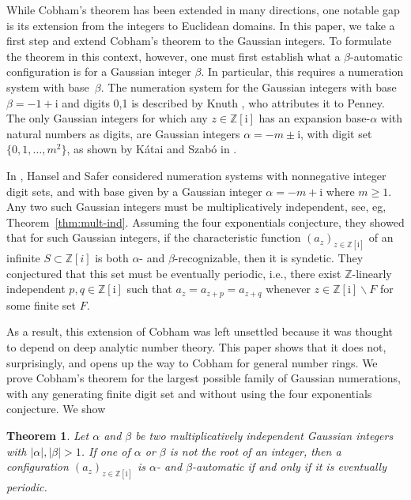 \documentclass{amsart}
\newcommand{\Z}{\mathbb{Z}}
\newcommand{\ii}{\mathrm{i}}
\newtheorem{theorem}{Theorem}
\newtheorem*{main theorem}{Theorem \ref{thm:main-gaussian}}
\theoremstyle{definition}
\begin{document}
While Cobham’s theorem has been extended in many directions, one notable gap is its extension from the integers to Euclidean domains.
In this paper, we take a first step and extend Cobham's theorem to the Gaussian integers.
To formulate the theorem in this context, however, one must first establish what a $\beta$-automatic configuration is for a Gaussian integer $\beta$. In particular, this requires a numeration system with base~$\beta$. 
The numeration system for the Gaussian integers with base  $\beta=-1+\ii $ and digits 0,1 is described by Knuth \cite[Section 4.1]{Knuth:1988}, who attributes it to Penney\cite{Penney}. The only Gaussian integers for which any  $z\in \Z[\ii]$ has an expansion base-$\alpha$   with natural numbers as digits, are  Gaussian integers $\alpha = -m\pm\ii$, with digit set  $\{0,1,\dots , m^2\}$, as shown by Kátai and Szabó in \cite{Katai-Szabo}.  


 In \cite{Hansel-Safer}, Hansel and Safer considered numeration systems with nonnegative integer digit sets, and with base given by a Gaussian integer  $\alpha = -m+\ii$  where $m\geq 1$.
  Any two such Gaussian integers  must be multiplicatively independent, see, eg, Theorem~\ref{thm:mult-ind}. Assuming the four exponentials conjecture, they showed that  for such  Gaussian integers,  if the characteristic function  $(a_z)_{z\in \mathbb Z[\ii]}$    of an infinite $S\subset \Z[i]$ is both $\alpha$- and $\beta$-recognizable, then it is syndetic. They  conjectured that this set must be eventually periodic, i.e.,  there exist $\Z$-linearly independent $p,q\in \Z[\ii]$ such that $a_z=a_{z+p}=a_{z+q}$ whenever $z\in \Z[\ii] \backslash F$ for some finite set $F$. 


As a result, this extension of Cobham was left unsettled because it was thought to depend on deep analytic number theory. This paper shows that it does not, surprisingly, and opens up the way to Cobham for general number rings. We prove Cobham's theorem for the largest possible family of Gaussian numerations, with any generating finite digit set and without using the four exponentials conjecture. We show
\begin{theorem}\label{thm:main-gaussian}
Let $\alpha$ and $\beta$ be two multiplicatively independent Gaussian integers with $|\alpha|, |\beta|>1$. 
If one of $\alpha$ or
 $\beta$ is not the root of an integer,
then a configuration $(a_z)_{z\in \mathbb Z[\ii]}$ is  $\alpha$- and $\beta$-automatic if and only if  it is eventually periodic. 
\end{theorem}
\end{document}

